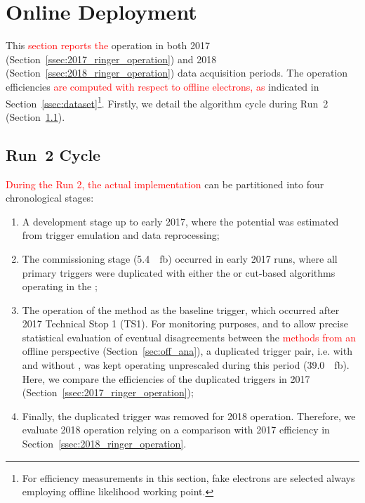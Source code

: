 \chapter{Online Deployment}%
\label{sec:operation}



This \textcolor{red}{section reports the \rnn{}} operation in both 2017
(Section~\ref{ssec:2017_ringer_operation}) and 2018
(Section~\ref{ssec:2018_ringer_operation}) data acquisition periods. The operation efficiencies
\textcolor{red}{are computed with respect to offline electrons, as} indicated in
Section~\ref{ssec:dataset}\footnote{For efficiency measurements in this section,
	fake electrons are selected always employing \veto\vloose{} offline likelihood
	working point.}. Firstly, we detail the algorithm cycle during Run~2
(Section~\ref{ssec:run2_rnn_cycle}).

\section{Run~2 \rnn{} Cycle}\label{ssec:run2_rnn_cycle}

\textcolor{red}{During the Run 2, the actual} \rnn{} \textcolor{red}{implementation} 
can be partitioned into four chronological stages:

\begin{enumerate}[i]
  \item A development stage up to early 2017, where the \rnn{}
      potential was estimated from trigger emulation and data reprocessing;
  \item The commissioning stage (\SI{5.4}{\per\femto\barn}) occurred in
      early 2017 runs, where all primary
      triggers were duplicated with either the \rnn{} or cut-based algorithms
      operating in the \fastcalo{};
  \item The operation of the method as the baseline trigger, which occurred after 2017 Technical Stop 1 (TS1). For
    monitoring purposes, and to allow precise statistical evaluation of eventual
    disagreements between the \fastcalo{} \textcolor{red}{methods from an} offline
    perspective (Section~\ref{sec:off_ana}), a duplicated trigger pair, i.e.
    with and without \rnn{}, was kept operating unprescaled during this period
    (\SI{39.0}{\per\femto\barn}). Here, we compare the efficiencies of the
    duplicated triggers in 2017 (Section~\ref{ssec:2017_ringer_operation});
  \item Finally, the duplicated trigger was removed for 2018 operation.
    Therefore, we evaluate 2018 \rnn{} operation relying on a comparison with
    2017 efficiency in Section~\ref{ssec:2018_ringer_operation}.
\end{enumerate}

